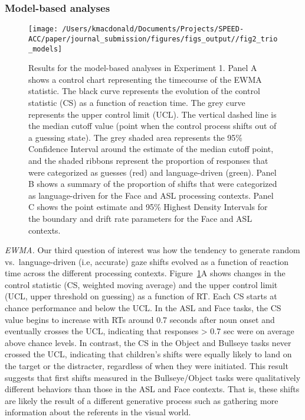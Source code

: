 \documentclass[english,floatsintext,man]{apa6}
\begin{document}
\hypertarget{model-based-analyses}{%
\subsubsection{Model-based analyses}\label{model-based-analyses}}

\begin{figure}[!t]

{\centering \texttt{[image: /Users/kmacdonald/Documents/Projects/SPEED-ACC/paper/journal\_submission/figures/figs\_output//fig2\_trio\_models]} 

}

\caption{Results for the model-based analyses in Experiment 1. Panel A shows a control chart representing the timecourse of the EWMA statistic. The black curve represents the evolution of the control statistic (CS) as a function of reaction time. The grey curve represents the upper control limit (UCL). The vertical dashed line is the median cutoff value (point when the control process shifts out of a guessing state). The grey shaded area represents the 95\% Confidence Interval around the estimate of the median cutoff point, and the shaded ribbons represent the proportion of responses that were categorized as guesses (red) and language-driven (green). Panel B shows a summary of the proportion of shifts that were categorized as language-driven for the Face and ASL processing contexts. Panel C shows the point estimate and 95\% Highest Density Intervals for the boundary and drift rate parameters for the Face and ASL contexts.}\label{fig:trio-model-plot}
\end{figure}

\emph{EWMA.} Our third question of interest was how the tendency to
generate random vs.~language-driven (i.e, accurate) gaze shifts evolved
as a function of reaction time across the different processing contexts.
Figure~\ref{fig:trio-model-plot}A shows changes in the control statistic
(CS, weighted moving average) and the upper control limit (UCL, upper
threshold on guessing) as a function of RT. Each CS starts at chance
performance and below the UCL. In the ASL and Face tasks, the CS value
begins to increase with RTs around 0.7 seconds after noun onset and
eventually crosses the UCL, indicating that responses \textgreater{} 0.7
sec were on average above chance levels. In contrast, the CS in the
Object and Bullseye tasks never crossed the UCL, indicating that
children's shifts were equally likely to land on the target or the
distracter, regardless of when they were initiated. This result suggests
that first shifts measured in the Bullseye/Object tasks were
qualitatively different behaviors than those in the ASL and Face
contexts. That is, these shifts are likely the result of a different
generative process such as gathering more information about the
referents in the visual world.
\end{document}

